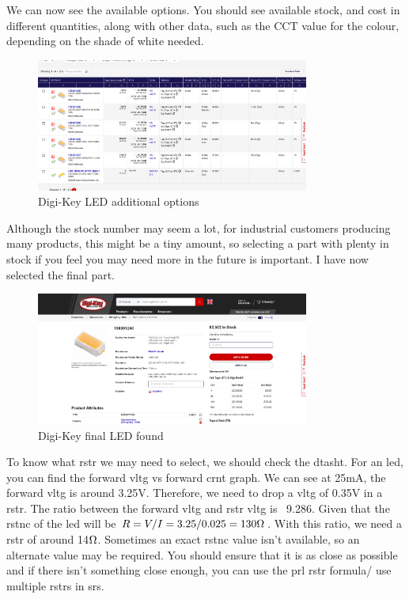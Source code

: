 \documentclass[a4paper,11pt]{report}
\begin{document}
We can now see the available options. You should see available stock, and cost in different quantities, along with other data, such as the CCT value for the colour, depending on the shade of white needed.


\begin{figure}[H]
\centering
\includegraphics[width=0.8\textwidth]{screenshots/DigiKeyWhiteLEDPageOptions}
\caption{Digi-Key LED additional options}
\end{figure}

Although the stock number may seem a lot, for industrial customers producing many products, this might be a tiny amount, so selecting a part with plenty in stock if you feel you may need more in the future is important. I have now selected the final part.


\begin{figure}[H]
\centering
\includegraphics[width=0.8\textwidth]{screenshots/DigiKeyWhiteLEDFinalPart}
\caption{Digi-Key final LED found}
\end{figure}

To know what \gls{rstr} we may need to select, we should check the \gls{dtasht}. For an \gls{led}, you can find the forward \gls{vltg} vs forward \gls{crnt} graph. We can see at 25mA, the forward \gls{vltg} is around 3.25V. Therefore, we need to drop a \gls{vltg} of 0.35V in a \gls{rstr}. The ratio between the forward \gls{vltg} and \gls{rstr} \gls{vltg} is ~9.286. Given that the \gls{rstnc} of the \gls{led} will be $R=V/I=3.25/0.025=130\ohm$. With this ratio, we need a \gls{rstr} of around 14$\ohm$. Sometimes an exact \gls{rstnc} value isn't available, so an alternate value may be required. You should ensure that it is as close as possible and if there isn't something close enough, you can use the \gls{prl} \gls{rstr} formula/ use multiple \gls{rstr}s in \gls{srs}.
\end{document}
